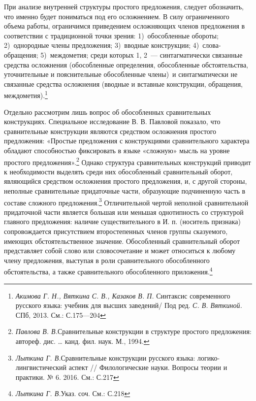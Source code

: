 \documentclass{kursa4}
\begin{document}
      При анализе внутренней структуры простого предложения, следует обозначить, что именно будет пониматься под его осложнением. В силу ограниченного объема работы, ограничимся приведением осложняющих членов предложения в соответствии с традиционной точки зрения: 1)~обособленные обороты; 2)~однородные члены предложения; 3)~вводные конструкции; 4)~слова-обращения; 5)~междометия; среди которых 1, 2~--- синтагматически связанные средства осложнения (обособленные определения, обособленные обстоятельства, уточнительные и пояснительные обособленные члены)~и синтагматически не связанные средства осложнения (вводные и вставные конструкции, обращения, междометия).\footnote{\textit{Акимова Г. Н., Вяткина С. В., Казаков В. П. }Синтаксис современного русского языка: учебник для высших заведений/ Под ред. \textit{С. В. Вяткиной.} СПб, 2013. См.: С.175—204} 

      Отдельно рассмотрим лишь вопрос об обособленных сравнительных конструкциях. Специальное исследование В. В. Павловой показало, что сравнительные конструкции являются средством осложнения простого предложения: «Простые предложения с конструкциями сравнительного характера обладают способностью фиксировать в языке «сложную» мысль на уровне простого предложения».\footnote{\textit{Павлова В. В.}Сравнительные конструкции в структуре простого предложения: автореф. дис. … канд. фил. наук. М., 1994.} Однако структура сравнительных конструкций приводит к необходимости выделять среди них обособленный сравнительный оборот, являющийся средством осложнения простого предложения, и, с другой стороны, неполные сравнительные придаточные части, образующие подчиненную часть в составе сложного предложения.\footnote{\textit{Лыткина Г. В.}Сравнительные конструкции русского языка: логико-лингвистический аспект // Филологические науки. Вопросы теории и практики. № 6. 2016. См.: С.217} Отличительной чертой неполной сравнительной придаточной части является большая или меньшая однотипность со структурой главного предложения: наличие существительного в И. п. (носитель признака) сопровождается присутствием второстепенных членов группы сказуемого, имеющих обстоятельственное значение.  Обособленный сравнительный оборот представляет собой слово или словосочетание и может относиться к любому члену предложения, выступая в роли сравнительного обособленного обстоятельства, а также сравнительного обособленного приложения.\footnote{\textit{Лыткина Г. В.}Указ. соч. См.: С.218} 
\end{document}
